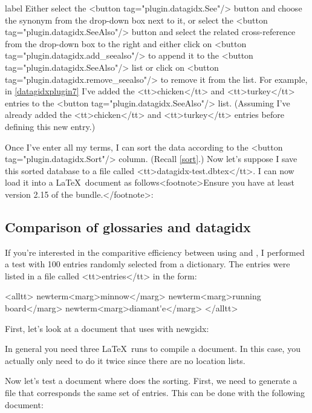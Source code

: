 \begin{example}{label}{}
   Either select the <button tag="plugin.datagidx.See"/> button and choose
   the synonym from the drop-down box next to it, or select the 
   <button tag="plugin.datagidx.SeeAlso"/> button and select the related 
   cross-reference from the drop-down box to the right and either click on
   <button tag="plugin.datagidx.add_seealso"/> to append it to the 
   <button tag="plugin.datagidx.SeeAlso"/> list or click on 
   <button tag="plugin.datagidx.remove_seealso"/> to remove it from the list.
   For example, in \autoref{datagidxplugin7} I've added the <tt>chicken</tt>
   and <tt>turkey</tt> entries to the <button tag="plugin.datagidx.SeeAlso"/>
   list. (Assuming I've already added the <tt>chicken</tt> and <tt>turkey</tt>
   entries before defining this new entry.)


   Once I've enter all my terms, I can sort the data according to 
   the <button tag="plugin.datagidx.Sort"/> column. (Recall \autoref{sort}.)
   Now let's suppose I save this sorted database to a file
   called <tt>datagidx-test.dbtex</tt>. I can now load it into 
   a \LaTeX\ document as follows<footnote>Ensure you have at least
   version 2.15 of the  bundle.</footnote>:


\end{example}

\subsection{Comparison of glossaries and datagidx}\label{comparison}

   If you're interested in the comparitive efficiency between
   using  and , I performed
   a test with 100 entries randomly selected from a dictionary.
   The entries were listed in a file called <tt>entries</tt> in
   the form:

<alltt>
\gls{newterm}<marg>minnow</marg>
\gls{newterm}<marg>running board</marg>
\gls{newterm}<marg>diamant\gls{'}e</marg>
</alltt>

   First, let's look at a document that uses  with \gls{newgidx}:



   In general you need three \LaTeX\ runs to compile a 
   document. In this case, you actually only need to do it twice
   since there are no location lists.


   Now let's test a  document where  does the
   sorting. First, we need to generate a 
   file that corresponds the same set of entries. This can be done
   with the following document:

